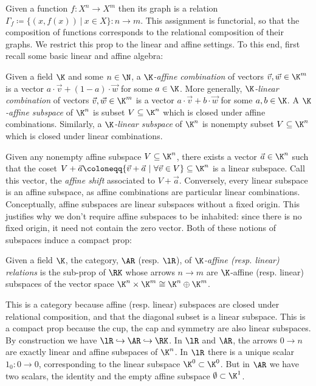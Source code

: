 Given a function \(f:X^n\to X^m\) then its graph is a relation \(\Gamma_f\coloneqq \{(x,f(x))\ |\ x\in X \}:n\to m\). This assignment is functorial, so that the composition of functions corresponds to the relational composition of their graphs.
We restrict this prop to the linear and affine settings. To this end, first recall some basic linear and affine algebra:
\begin{definition}
  Given a field \(\K\) and some \(n\in\N\), a {\em \(\K\)-affine combination} of vectors \(\vec v, \vec w \in \K^m\) is a vector \(a \cdot \vec v + (1-a)\cdot \vec w \) for some \(a\in\K\). More generally, {\em \(\K\)-linear combination} of vectors \(\vec v, \vec w \in \K^m\) is a vector \(a \cdot \vec v + b\cdot \vec w \) for some \(a,b\in\K\).
  A {\em \(\K\)-affine subspace} of \(\K^n\) is subset \(V\subseteq \K^n\) which is closed under affine combinations. Similarly, a {\em \(\K\)-linear subspace} of \(\K^n\) is nonempty subset \(V\subseteq \K^n\) which is closed under linear combinations.
\end{definition}
Given any nonempty affine subspace \(V\subseteq \K^n\), there exists a  vector \(\vec a\in\K^n\)  such that the coset \( V+ \vec a \coloneqq \{\vec v+\vec a \ | \ \forall \vec v \in V \}\subseteq \K^n \) is a linear subspace.  Call this vector, the {\em affine shift} associated to \(V+\vec a\).
Conversely, every linear subspace is an affine subspace, as affine combinations are particular linear combinations.  Conceptually, affine subspaces are linear subspaces without a fixed origin. This justifies why we don't require affine subspaces to be inhabited: since there is no fixed origin, it need not contain the zero vector.
Both of these notions of subspaces induce a compact prop:
\begin{definition}
  Given a field \(\K\), the category, \(\AR\) (resp. \(\lR\)), of {\em \(\K\)-affine (resp. linear) relations} is the sub-prop of  \(\RK\) whose arrows \(n\to m\) are \(\K\)-affine (resp. linear) subspaces of the vector space \(\K^n\times\K^m \cong \K^{n}\oplus \K^m\).
\end{definition}
This is a category because affine (resp. linear) subspaces are closed under relational composition, and that the diagonal subset is a linear subspace. This is a compact prop because the cup, the cap and symmetry are also linear subspaces.
By construction we have \(\lR \hookrightarrow \AR \hookrightarrow \RK\). In \(\lR\) and \(\AR\), the arrows \(0 \to n\) are exactly linear and affine subspaces of \(\K^n\).  In \(\lR\) there is a unique scalar \(1_0:0\to 0\), corresponding to the linear subspace \(\K^0 \subset \K^0\). But in \(\AR\) we have two scalars, the identity and the empty affine subspace \(\emptyset\subset \K^1\).
